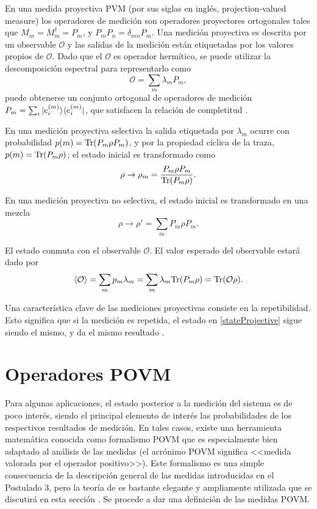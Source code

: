 En una medida proyectiva PVM (por sus siglas en inglés, projection-valued
measure) los operadores de medición son operadores proyectores ortogonales
tales que $M_{m}=M_{m}^{\dagger}=P_{m}$, y $P_{m}P_{n}=\delta_{mn}P_{m}$. Una
medición proyectiva es descrita por un observable $\mathcal{O}$ y las salidas
de la medición están etiquetadas por los valores propios de $\mathcal{O}$. Dado
que el $\mathcal{O}$ es operador hermítico, se puede utilizar la descomposición
espectral para representarlo como 
\begin{equation}
	\mathcal{O}=\sum_m \lambda_m P_m ,
\end{equation}
puede obtenerse un conjunto ortogonal de operadores de medición $P_m=\sum_i
|e_i^{(m)}\rangle \langle e_i^{(m)}|$, que satisfacen la relación de completitud
{\cite{2007geometry}}. 

En una medición proyectiva selectiva la salida etiquetada por $\lambda_m$
ocurre con probabilidad $p(m)={\rm Tr}(P_m\rho P_m)$, y por la propiedad cíclica de
la traza,  $p(m)={\rm Tr}(P_m\rho)$; el estado inicial es transformado como 
\begin{equation}\label{stateProjective}
	\rho\to	\rho_m=\dfrac{P_m\rho P_m}{{\rm Tr}(P_m \rho)}.
\end{equation}

 En una medición proyectiva no selectiva, el estado inicial es transformado en
una mezcla  
\begin{equation}
	\rho \to \rho'=\sum_m P_m \rho P_m.
\end{equation} 


El estado conmuta con el observable $\mathcal{O}$. El valor esperado del
observable estará dado por 
\begin{equation}
	\langle \mathcal{O} \rangle=\sum_m p_m\lambda_m=\sum_m \lambda_m
{\rm Tr}(P_m\rho)={\rm Tr}(\mathcal{O}\rho).
\end{equation}

Una característica clave de las mediciones proyectivas consiste en la
repetibilidad. Esto significa que si la medición es repetida, el estado en
{\ref{stateProjective}} sigue siendo el mismo, y da el mismo resultado
{\cite{2007geometry}}.
\section{Operadores POVM}\label{operadoresPOVM} %
Para algunas aplicaciones, el estado posterior a la medición del sistema es de poco interés, siendo el
principal elemento de interés las probabilidades de los respectivos resultados
de medición. En tales casos, existe una herramienta matemática conocida como
formalismo POVM que es especialmente bien adaptado al análisis de las medidas
(el acrónimo POVM significa <<medida valorada por el operador positivo>>). Este
formalismo es una simple consecuencia de la descripción general de las medidas
introducidas en el Postulado 3, pero la teoría de es bastante elegante y
ampliamente utilizada que se discutirá en esta sección
{\cite{nielsen_chuang_2010}}. Se procede a dar una definición de las medidas
POVM\@. 


